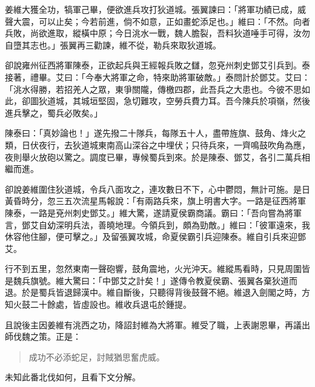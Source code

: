 姜維大獲全功，犒軍己畢，便欲進兵攻打狄道城。張翼諫曰：「將軍功績已成，威聲大震，可以止矣；今若前進，倘不如意，正如畫蛇添足也。」維曰：「不然。向者兵敗，尚欲進取，縱橫中原；今日洮水一戰，魏人膽裂，吾料狄道唾手可得，汝勿自墮其志也。」張翼再三勸諫，維不從，勒兵來取狄道城。

卻說雍州征西將軍陳泰，正欲起兵與王經報兵敗之讎，忽兗州刺史鄧艾引兵到。泰接著，禮畢。艾曰：「今奉大將軍之命，特來助將軍破敵。」泰問計於鄧艾。艾曰：「洮水得勝，若招羌人之眾，東爭關隴，傳檄四郡，此吾兵之大患也。今彼不思如此，卻圖狄道城，其城垣堅固，急切難攻，空勞兵費力耳。吾今陳兵於項嶺，然後進兵擊之，蜀兵必敗矣。」

陳泰曰：「真妙論也！」遂先撥二十隊兵，每隊五十人，盡帶旌旗、鼓角、烽火之類，日伏夜行，去狄道城東南高山深谷之中埋伏；只待兵來，一齊鳴鼓吹角為應，夜則舉火放砲以驚之。調度已畢，專候蜀兵到來。於是陳泰、鄧艾，各引二萬兵相繼而進。

卻說姜維圍住狄道城，令兵八面攻之，連攻數日不下，心中鬱悶，無計可施。是日黃昏時分，忽三五次流星馬報說：「有兩路兵來，旗上明書大字。一路是征西將軍陳泰，一路是兗州刺史鄧艾。」維大驚，遂請夏侯霸商議。霸曰：「吾向嘗為將軍言，鄧艾自幼深明兵法，善曉地理。今領兵到，頗為勁敵。」維曰：「彼軍遠來，我休容他住腳，便可擊之。」及留張翼攻城，命夏侯霸引兵迎陳泰。維自引兵來迎鄧艾。

行不到五里，忽然東南一聲砲響，鼓角震地，火光沖天。維縱馬看時，只見周圍皆是魏兵旗號。維大驚曰：「中鄧艾之計矣！」遂傳令教夏侯霸、張翼各棄狄道而退。於是蜀兵皆退歸漢中。維自斷後，只聽得背後鼓聲不絕。維退入劍閣之時，方知火鼓二十餘處，皆虛設也。維收兵退屯於鍾提。

且說後主因姜維有洮西之功，降詔封維為大將軍。維受了職，上表謝恩畢，再議出師伐魏之策。正是：

\begin{quote}
成功不必添蛇足，討賊猶思奮虎威。
\end{quote}

未知此番北伐如何，且看下文分解。
